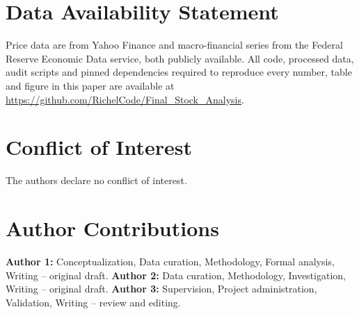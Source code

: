 \documentclass[11pt]{article}
\begin{document}
\section*{Data Availability Statement}
Price data are from Yahoo Finance and macro-financial series from the Federal
Reserve Economic Data service, both publicly available. All code, processed
data, audit scripts and pinned dependencies required to reproduce every number,
table and figure in this paper are available at
\url{https://github.com/RichelCode/Final_Stock_Analysis}.

\section*{Conflict of Interest}
The authors declare no conflict of interest.

\section*{Author Contributions}
\textbf{Author 1:} Conceptualization, Data curation, Methodology, Formal
analysis, Writing -- original draft.
\textbf{Author 2:} Data curation, Methodology, Investigation, Writing --
original draft.
\textbf{Author 3:} Supervision, Project administration, Validation, Writing --
review and editing.


\end{document}

